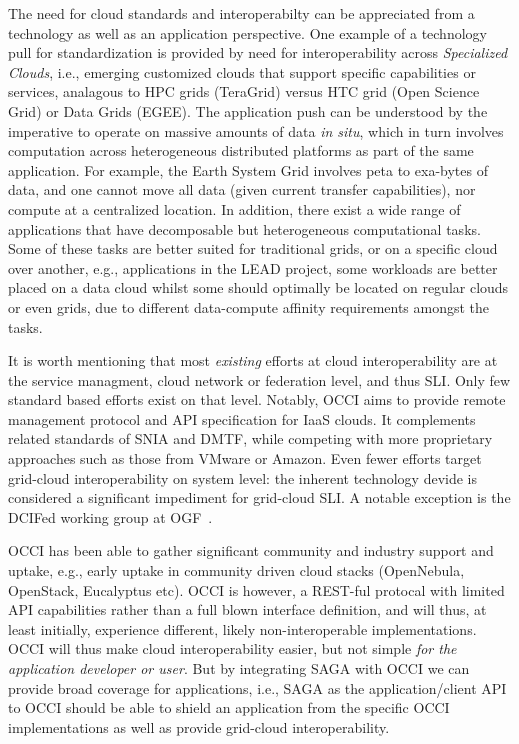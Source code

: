 \documentclass[10pt,conference,final,letterpaper,twoside,twocolumn,]{IEEEtran}
\newcommand{\I}[1]{\textit{#1}}
\begin{document}
 The need for cloud standards and interoperabilty can be appreciated
 from a technology as well as an application perspective. One example
 of a technology pull for standardization is provided by need for
 interoperability across {\it Specialized Clouds}, i.e., emerging
 customized clouds that support specific capabilities or services,
 analagous to HPC grids (TeraGrid) versus HTC grid (Open Science Grid)
 or Data Grids (EGEE).  The application push can be understood by the
 imperative to operate on massive amounts of data {\it in situ}, which
 in turn involves computation across heterogeneous distributed
 platforms as part of the same application.  For example, the Earth
 System Grid involves peta to exa-bytes of data, and one cannot move
 all data (given current transfer capabilities), nor compute at a
 centralized location.  In addition, there exist a wide range of
 applications that have decomposable but heterogeneous computational
 tasks.  Some of these tasks are better suited for traditional grids,
 or on a specific cloud over another, e.g., applications in the LEAD
 project, some workloads are better placed on a data cloud whilst some
 should optimally be located on regular clouds or even grids, due to
 different data-compute affinity requirements amongst the tasks. 

 It is worth mentioning that most \I{existing} efforts at cloud
 interoperability are at the service managment, cloud network or
 federation level, and thus SLI.  Only few standard based efforts
 exist on that level.  Notably, OCCI aims to provide remote management
 protocol and API specification for IaaS clouds.  It complements
 related standards of SNIA and DMTF, while competing with more
 proprietary approaches such as those from VMware or Amazon.  Even
 fewer efforts target grid-cloud interoperability on system level: the
 inherent technology devide is considered a significant impediment for
 grid-cloud SLI.  A notable exception is the DCIFed working group at
 OGF~\cite{dcifed-www}.
 

 OCCI has been able to gather significant community and industry
 support and uptake, e.g., early uptake in community driven cloud
 stacks (OpenNebula, OpenStack, Eucalyptus etc).  OCCI is however, a
 REST-ful protocal with limited API capabilities rather than a full
 blown interface definition, and will thus, at least initially,
 experience different, likely non-interoperable implementations. OCCI
 will thus make cloud interoperability easier, but not simple {\it for
   the application developer or user}.  But by integrating SAGA with
 OCCI we can provide broad coverage for applications, i.e., SAGA as
 the application/client API to OCCI should be able to shield an
 application from the specific OCCI implementations as well as provide
 grid-cloud interoperability.
\end{document}
